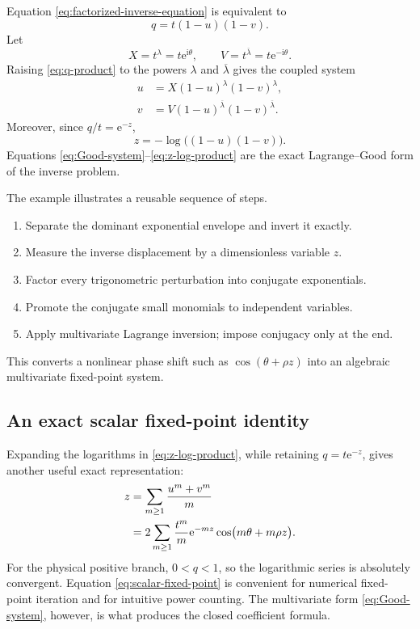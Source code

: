 \documentclass[11pt,oneside]{article}
\theoremstyle{plain}
\theoremstyle{definition}
\theoremstyle{remark}
\newcommand{\e}{\mathrm{e}}
\newcommand{\ii}{\mathrm{i}}
\begin{document}
Equation \eqref{eq:factorized-inverse-equation} is equivalent to
\begin{equation}
 q=t(1-u)(1-v).
 \label{eq:q-product}
\end{equation}
Let
\begin{equation}
 X=t^\lambda=t\e^{\ii\theta},
 \qquad
 V=t^{\overline\lambda}=t\e^{-\ii\theta}.
 \label{eq:X-V}
\end{equation}
Raising \eqref{eq:q-product} to the powers \(\lambda\) and
\(\overline\lambda\) gives the coupled system
\begin{equation}
 \boxed{
 \begin{aligned}
 u&=X(1-u)^\lambda(1-v)^\lambda,\\
 v&=V(1-u)^{\overline\lambda}(1-v)^{\overline\lambda}.
 \end{aligned}}
 \label{eq:Good-system}
\end{equation}
Moreover, since \(q/t=\e^{-z}\),
\begin{equation}
 \boxed{
 z=-\log\bigl((1-u)(1-v)\bigr).}
 \label{eq:z-log-product}
\end{equation}
Equations \eqref{eq:Good-system}--\eqref{eq:z-log-product} are the exact
Lagrange--Good form of the inverse problem.

\begin{methodbox}[title={The normalization pattern}]
The example illustrates a reusable sequence of steps.
\begin{enumerate}
\item Separate the dominant exponential envelope and invert it exactly.
\item Measure the inverse displacement by a dimensionless variable \(z\).
\item Factor every trigonometric perturbation into conjugate exponentials.
\item Promote the conjugate small monomials to independent variables.
\item Apply multivariate Lagrange inversion; impose conjugacy only at the end.
\end{enumerate}
This converts a nonlinear phase shift such as
\(\cos(\theta+\rho z)\) into an algebraic multivariate fixed-point system.
\end{methodbox}

\subsection{An exact scalar fixed-point identity}

Expanding the logarithms in \eqref{eq:z-log-product}, while retaining
\(q=t\e^{-z}\), gives another useful exact representation:
\begin{align}
 z
 &=\sum_{m\ge1}\frac{u^m+v^m}{m} \notag\\
 &=2\sum_{m\ge1}\frac{t^m}{m}\e^{-mz}
 \cos\bigl(m\theta+m\rho z\bigr).
 \label{eq:scalar-fixed-point}
\end{align}
For the physical positive branch, \(0<q<1\), so the logarithmic series is
absolutely convergent.  Equation \eqref{eq:scalar-fixed-point} is convenient
for numerical fixed-point iteration and for intuitive power counting.  The
multivariate form \eqref{eq:Good-system}, however, is what produces the closed
coefficient formula.
\end{document}
